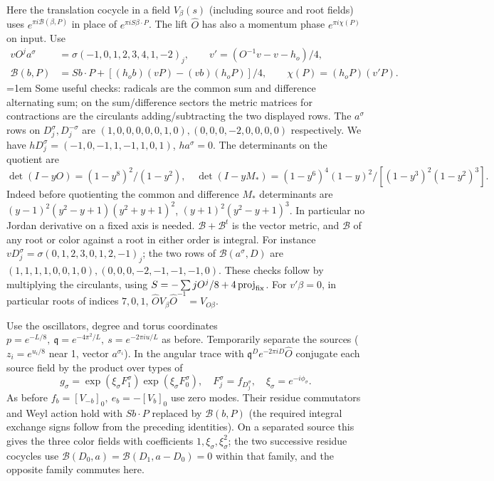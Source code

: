 \documentclass[11pt]{article}
\numberwithin{equation}{section}
\theoremstyle{definition}\newtheorem{definition}[theorem]{Definition}
\theoremstyle{remark}\newtheorem{remark}[theorem]{Remark}
\begin{document}
Here the translation cocycle in a field \(V_\beta(s)\) (including source and root fields) uses \(e^{\pi i \mathcal B(\beta,P)}\) in place of \(e^{\pi i S\beta\cdot P}\). The lift \(\widehat O\) has also a momentum phase \(e^{\pi i\chi(P)}\) on input. Use
\[
\begin{aligned}
 v O^j a^\sigma &=\sigma(-1,0,1,2,3,4,1,-2)_j,\qquad v'=(O^{-1}v-v-h_o)/4,\\
 \mathcal B(b,P)&=S b\cdot P+[(h_o b)(vP)-(vb)(h_o P)]/4,\qquad
 \chi(P)=(h_oP)(v' P).
\end{aligned}
\]
\begingroup\emergencystretch=1em
Some useful checks: radicals are the common sum and difference alternating sum; on the sum/difference sectors the metric matrices for contractions are the circulants adding/subtracting the two displayed rows. The \(a^\sigma\) rows on \(D_j^\sigma,D_j^{-\sigma}\) are \((1,0,0,0,0,0,1,0),(0,0,0,-2,0,0,0,0)\) respectively. We have \(hD_j^\sigma=(-1,0,-1,1,-1,1,0,1)\), \(ha^\sigma=0\). The determinants on the quotient are
\[
 \det(I-yO)=(1-y^8)^2/(1-y^2),\quad
 \det(I-yM_*)=(1-y^6)^4(1-y)^2/[(1-y^3)^2(1-y^2)^3].
\]
Indeed before quotienting the common and difference \(M_*\) determinants are \((y-1)^2(y^2-y+1)(y^2+y+1)^2\), \((y+1)^2(y^2-y+1)^3\). In particular no Jordan derivative on a fixed axis is needed. \(\mathcal B+\mathcal B^t\) is the vector metric, and \(\mathcal B\) of any root or color against a root in either order is integral. For instance \(vD_j^\sigma=\sigma(0,1,2,3,0,1,2,-1)_j\); the two rows of \(\mathcal B(a^\sigma,D)\) are \((1,1,1,1,0,0,1,0),(0,0,0,-2,-1,-1,-1,0)\). These checks follow by multiplying the circulants, using \(S=-\sum jO^j/8+4\,{\rm proj}_{\rm fix}\). For \(v'\beta=0\), in particular roots of indices \(7,0,1\), \(\widehat O V_\beta\widehat O^{-1}=V_{O\beta}\).
\par\endgroup

Use the oscillators, degree and torus coordinates \(p=e^{-L/8},\ \mathfrak q=e^{-4\pi^2/L},\ s=e^{-2\pi i u/L}\) as before. Temporarily separate the sources (\(z_i=e^{u_i/8}\) near 1, vector \(a^{\sigma_i}\)). In the angular trace with \(\mathfrak q^D e^{-2\pi iD}\widehat O\) conjugate each source field by the product over types of
\[
 g_\sigma=\exp(\xi_\sigma F_1^\sigma)\exp(\xi_\sigma F_0^\sigma),
 \quad F_j^\sigma=f_{D_j^\sigma},\quad \xi_\sigma=e^{-i\phi_\sigma}.
\]
As before \(f_b=[V_{-b}]_0,\ e_b=-[V_b]_0\) use zero modes. Their residue commutators and Weyl action hold with \(S b\cdot P\) replaced by \(\mathcal B(b,P)\) (the required integral exchange signs follow from the preceding identities). On a separated source this gives the three color fields with coefficients \(1,\xi_\sigma,\xi_\sigma^2\); the two successive residue cocycles use \(\mathcal B(D_0,a)=\mathcal B(D_1,a-D_0)=0\) within that family, and the opposite family commutes here.
\end{document}
